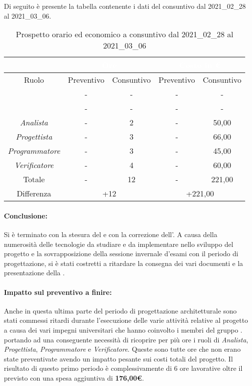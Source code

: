 Di seguito è presente la tabella contenente i dati del consuntivo dal 2021\_02\_28 al 2021\_03\_06.
\begin{table}[H]
	\centering
	\begin{tabular}{|c|c|c|c|c|}
		\rowcolor{darkblue} 
		&\multicolumn{2}{c|}{\textcolor{white}{Ore}}&\multicolumn{2}{c|}{\textcolor{white}{Costo in €}}\\ \hline
		Ruolo			&	Preventivo				&	Consuntivo		&	Preventivo	&	Consuntivo\\ \hline
		{\Responsabile}		&	-					&	-				&	-			&	- \\ \hline
		{\Amministratore}	&	-					&	-				&	-			&	- \\ \hline
		\textit{Analista}	&	-					&	2				&	-			&	50,00 \\ \hline
		\textit{Progettista}& 	-					&   3 				& 	-			&  	66,00 \\ \hline
		\textit{Programmatore}& -					& 	3				& 	-			&  	45,00 \\ \hline
		\textit{Verificatore}&	-					&	4				&	-			&	60,00 \\ \hline
		Totale				&	-					&	12				&	-			&	221,00 \\ \hline
		Differenza			& 	\multicolumn{2}{c|}{+12} 				&\multicolumn{2}{c|}{+221,00}\\ \hline
	\end{tabular}
	\caption{Prospetto orario ed economico a consuntivo dal 2021\_02\_28 al 2021\_03\_06}
\end{table}
\paragraph*{Conclusione:}
Si è terminato con la stesura del  e con la correzione dell'\AdR{}. A causa della numerosità delle tecnologie da studiare e da implementare nello sviluppo del progetto e la sovrapposizione della sessione invernale d'esami con il periodo di progettazione, si è stati costretti a ritardare la consegna dei vari documenti e la presentazione della .
\paragraph*{Impatto sul preventivo a finire:}
Anche in questa ultima parte del periodo di progettazione architetturale sono stati commessi ritardi durante l'esecuzione delle varie attività relative al progetto a causa dei vari impegni universitari che hanno coinvolto i membri del gruppo {\Gruppo}. portando ad una conseguente necessità di ricoprire per più ore i ruoli di \textit{Analista}, \textit{Progettista}, \textit{Programmatore} e \textit{Verificatore}. Queste sono tutte ore che non erano state preventivate avendo un impatto pesante sui costi totali del progetto.
Il risultato di questo primo periodo è complessivamente di 6 ore lavorative oltre il previsto con una spesa aggiuntiva di \textbf{176,00€}.